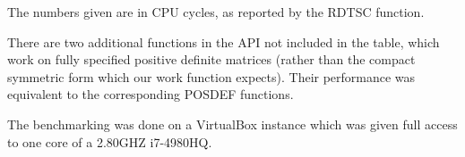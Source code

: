 \documentclass{article}
\begin{document}
The numbers given are in CPU cycles, as reported by the RDTSC function.

There are two additional functions in the API not included in the table, which
work on fully specified positive definite matrices (rather than the compact
symmetric form which our work function expects). Their performance was
equivalent to the corresponding POSDEF functions.

The benchmarking was done on a VirtualBox instance which was given full access
to one core of a 2.80GHZ i7-4980HQ.
\\

\end{document}
